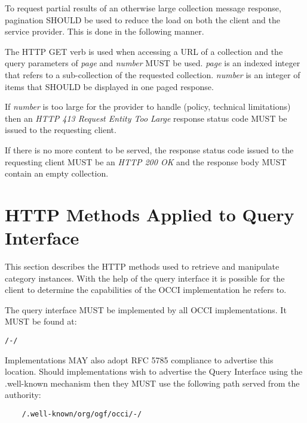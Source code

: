 \documentclass[10pt,a4paper]{article}
\begin{document}
To request partial results of an otherwise large collection message response, pagination SHOULD be used to reduce the load on
both the client and the service provider. This is done in the following manner.

The HTTP GET verb is used when accessing a URL of a collection and the query parameters of {\em page} and {\em number} MUST be used. {\em page} is an indexed
integer that refers to a sub-collection of the requested collection. {\em number} is an integer of items that SHOULD be displayed in one paged response.


If {\em number} is too large for the provider to handle (policy, technical limitations) then an \emph{HTTP 413 Request Entity Too Large} response status code MUST be issued to the requesting client.

If there is no more content to be served, the response status code issued to the requesting client MUST be an \emph{HTTP 200 OK} and the response body MUST contain an empty collection.

\section{HTTP Methods Applied to Query Interface}




This section describes the HTTP methods used to retrieve and manipulate category instances.  With the help of the query interface it is possible for the client to determine the capabilities of the OCCI implementation he refers to.

The query interface MUST be implemented by all OCCI implementations. It MUST be found at:

\begin{verbatim}
/-/
\end{verbatim}

Implementations MAY also adopt RFC 5785 \cite{rfc5785} compliance to advertise this location. Should implementations wish to advertise the Query Interface using the .well-known mechanism then they MUST use the following path served from the authority:

\begin{verbatim}
	/.well-known/org/ogf/occi/-/
\end{verbatim}
\end{document}
